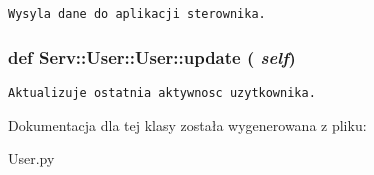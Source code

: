 \footnotesize\begin{verbatim}Wysyla dane do aplikacji sterownika.\end{verbatim}
\normalsize
 \hypertarget{class_serv_1_1_user_1_1_user_90697aec786a688ec3308b3ebdcc83a3}{
\subsubsection[{update}]{\setlength{\rightskip}{0pt plus 5cm}def Serv::User::User::update ( {\em self})}}
\label{class_serv_1_1_user_1_1_user_90697aec786a688ec3308b3ebdcc83a3}




\footnotesize\begin{verbatim}Aktualizuje ostatnia aktywnosc uzytkownika.\end{verbatim}
\normalsize
 

Dokumentacja dla tej klasy została wygenerowana z pliku:\begin{CompactItemize}
\item 
User.py\end{CompactItemize}
